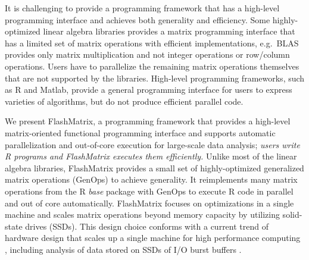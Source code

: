 
It is challenging to provide a programming framework that has a high-level
programming interface and achieves both generality and efficiency.
Some highly-optimized linear algebra libraries \cite{mkl, openblas, elemental,
trilinos, petsc} provides a matrix programming interface that has a limited
set of matrix operations with efficient implementations, e.g.~BLAS provides
only matrix multiplication and not integer operations or row/column operations.
Users have to parallelize the remaining matrix
operations themselves that are not supported by the libraries. 
High-level programming frameworks, such as R and Matlab, provide a
general programming interface for users to express varieties of algorithms, but
do not produce efficient parallel code.


We present FlashMatrix, a programming framework that provides a high-level
matrix-oriented functional programming interface and supports automatic
parallelization and out-of-core execution for large-scale data analysis;
\emph{users write R programs and FlashMatrix executes them efficiently.}
Unlike most of the linear algebra libraries, FlashMatrix provides a small
set of highly-optimized generalized matrix operations (GenOps) to achieve
generality. It reimplements many matrix operations from the R \textit{base}
package with GenOps to execute R code in parallel and
out of core automatically. FlashMatrix focuses on optimizations in
a single machine and scales matrix operations beyond memory capacity by utilizing
solid-state drives (SSDs). This design choice conforms with a current trend of
hardware design that scales up a single machine for high performance computing
\cite{Ang14}, including analysis of data stored on SSDs of I/O burst buffers
\cite{burst}.



